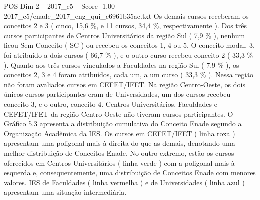 \begin{textsample}{POS Dim 2 – 2017\_c5 – Score -1.00 – 2017\_c5/enade\_2017\_eng\_qui\_c6961b35ac.txt}
Os demais cursos receberam os conceitos 2 e 3 ( cinco, 15,6 \%, e 11 cursos, 34,4 \%, respectivamente ).
Dos três cursos participantes de Centros Universitários da região Sul ( 7,9 \% ), nenhum ficou Sem Conceito ( SC ) ou recebeu os conceitos 1, 4 ou 5.
O conceito modal, 3, foi atribuído a dois cursos ( 66,7 \% ), e o outro curso recebeu conceito 2 ( 33,3 \% ).
Quanto aos três cursos vinculados a Faculdades na região Sul ( 7,9 \% ), os conceitos 2, 3 e 4 foram atribuídos, cada um, a um curso ( 33,3 \% ).
Nessa região não foram avaliados cursos em CEFET/IFET.
Na região Centro-Oeste, os dois únicos cursos participantes eram de Universidades, um dos cursos recebeu conceito 3, e o outro, conceito 4.
Centros Universitários, Faculdades e CEFET/IFET da região Centro-Oeste não tiveram cursos participantes.
O Gráfico 5.3 apresenta a distribuição cumulativa do Conceito Enade segundo a Organização Acadêmica da IES.
Os cursos em CEFET/IFET ( linha roxa ) apresentam uma poligonal mais à direita do que as demais, denotando uma melhor distribuição de Conceitos Enade.
No outro extremo, estão os cursos oferecidos em Centros Universitários ( linha verde ) com a poligonal mais à esquerda e, consequentemente, uma distribuição de Conceitos Enade com menores valores.
IES de Faculdades ( linha vermelha ) e de Universidades ( linha azul ) apresentam uma situação intermediária.

\end{textsample}
